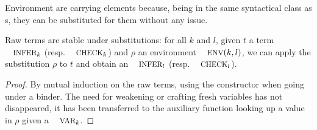 \documentclass[a4paper,UKenglish]{lipics-v2016}
\begin{document}
Environment are carrying \Inferable{} elements because, being in the
same syntactical class as \Var{}s, they can be substituted for them
without any issue.

\begin{lemma}Raw terms are stable under substitutions: for all $k$ and
$l$, given $t$ a term $\Inferable{k}$ (resp. $\Checkable{k}$) and $ρ$
an environment $\Env{}(k,l)$, we can apply the substitution $ρ$ to $t$
and obtain an $\Inferable{l}$ (resp. $\Checkable{l}$).
\end{lemma}
\begin{proof}By mutual induction on the raw terms, using the \envextend{}
\Env{} constructor when going under a binder. The need for weakening or
crafting fresh variables has not disappeared, it has been transferred to
the auxiliary function looking up a value in $ρ$ given a $\Var{k}$.
\end{proof}
\end{document}
